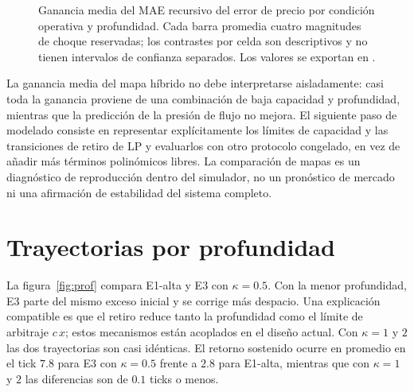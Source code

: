\begin{figure}[H]
\centering
{}
\caption{Ganancia media del MAE recursivo del error de precio por condición operativa y profundidad. Cada barra promedia cuatro magnitudes de choque reservadas; los contrastes por celda son descriptivos y no tienen intervalos de confianza separados. Los valores se exportan en .}
\label{fig:hybrid-cell-gains}
\end{figure}

La ganancia media del mapa híbrido no debe interpretarse aisladamente: casi toda la ganancia proviene de una combinación de baja capacidad y profundidad, mientras que la predicción de la presión de flujo no mejora. El siguiente paso de modelado consiste en representar explícitamente los límites de capacidad y las transiciones de retiro de LP y evaluarlos con otro protocolo congelado, en vez de añadir más términos polinómicos libres. La comparación de mapas es un diagnóstico de reproducción dentro del simulador, no un pronóstico de mercado ni una afirmación de estabilidad del sistema completo.

\section{Trayectorias por profundidad}

La figura~\ref{fig:prof} compara E1-alta y E3 con $\kappa=0.5$. Con la menor profundidad, E3 parte del mismo exceso inicial y se corrige más despacio. Una explicación compatible es que el retiro reduce tanto la profundidad como el límite de arbitraje $c\,x$; estos mecanismos están acoplados en el diseño actual. Con $\kappa=1$ y $2$ las dos trayectorias son casi idénticas. El retorno sostenido ocurre en promedio en el tick $7.8$ para E3 con $\kappa=0.5$ frente a $2.8$ para E1-alta, mientras que con $\kappa=1$ y $2$ las diferencias son de $0.1$ ticks o menos.

